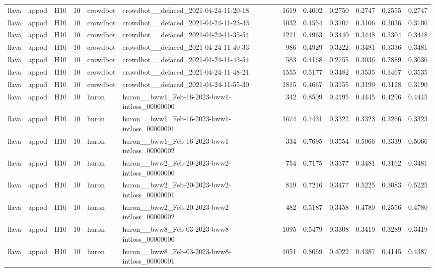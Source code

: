 \begin{table}[tbp]
\begin{tabular}{lllrllrrrrrr}
llava & appod & H10 & 10 & crowdbot & crowdbot\_\_defaced\_2021-04-24-11-20-18 & 1619 & 0.4002 & 0.2750 & 0.2747 & 0.2555 & 0.2747 \\
llava & appod & H10 & 10 & crowdbot & crowdbot\_\_defaced\_2021-04-24-11-23-43 & 1032 & 0.4554 & 0.3107 & 0.3106 & 0.3036 & 0.3106 \\
llava & appod & H10 & 10 & crowdbot & crowdbot\_\_defaced\_2021-04-24-11-35-54 & 1211 & 0.4963 & 0.3440 & 0.3448 & 0.3304 & 0.3448 \\
llava & appod & H10 & 10 & crowdbot & crowdbot\_\_defaced\_2021-04-24-11-40-33 & 986 & 0.4929 & 0.3222 & 0.3481 & 0.3336 & 0.3481 \\
llava & appod & H10 & 10 & crowdbot & crowdbot\_\_defaced\_2021-04-24-11-43-54 & 583 & 0.4168 & 0.2755 & 0.3036 & 0.2889 & 0.3036 \\
llava & appod & H10 & 10 & crowdbot & crowdbot\_\_defaced\_2021-04-24-11-48-21 & 1555 & 0.5177 & 0.3482 & 0.3535 & 0.3467 & 0.3535 \\
llava & appod & H10 & 10 & crowdbot & crowdbot\_\_defaced\_2021-04-24-11-55-30 & 1815 & 0.4667 & 0.3155 & 0.3190 & 0.3128 & 0.3190 \\
llava & appod & H10 & 10 & huron & huron\_\_bww1\_Feb-16-2023-bww1-intloss\_00000000 & 342 & 0.8509 & 0.4195 & 0.4445 & 0.4296 & 0.4445 \\
llava & appod & H10 & 10 & huron & huron\_\_bww1\_Feb-16-2023-bww1-intloss\_00000001 & 1674 & 0.7431 & 0.3322 & 0.3323 & 0.3266 & 0.3323 \\
llava & appod & H10 & 10 & huron & huron\_\_bww1\_Feb-16-2023-bww1-intloss\_00000002 & 334 & 0.7695 & 0.3554 & 0.5066 & 0.3339 & 0.5066 \\
llava & appod & H10 & 10 & huron & huron\_\_bww2\_Feb-20-2023-bww2-intloss\_00000000 & 754 & 0.7175 & 0.3377 & 0.3481 & 0.3162 & 0.3481 \\
llava & appod & H10 & 10 & huron & huron\_\_bww2\_Feb-20-2023-bww2-intloss\_00000001 & 819 & 0.7216 & 0.3477 & 0.5225 & 0.3083 & 0.5225 \\
llava & appod & H10 & 10 & huron & huron\_\_bww2\_Feb-20-2023-bww2-intloss\_00000002 & 482 & 0.5187 & 0.3458 & 0.4780 & 0.2556 & 0.4780 \\
llava & appod & H10 & 10 & huron & huron\_\_bww8\_Feb-03-2023-bww8-intloss\_00000000 & 1095 & 0.5479 & 0.3308 & 0.3419 & 0.3289 & 0.3419 \\
llava & appod & H10 & 10 & huron & huron\_\_bww8\_Feb-03-2023-bww8-intloss\_00000001 & 1051 & 0.8069 & 0.4022 & 0.4387 & 0.4145 & 0.4387 \\

\end{tabular}
\end{table}
